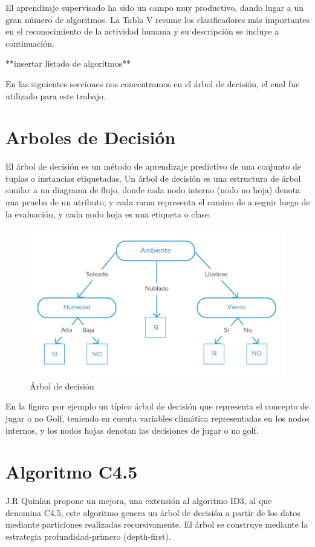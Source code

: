 El aprendizaje supervisado ha sido un campo muy productivo, dando lugar a un gran número de algoritmos. La Tabla V resume los clasificadores más importantes en el reconocimiento de la actividad humana y su descripción se incluye a continuación.

**insertar listado de algoritmos**

En las siguientes secciones nos concentramos en el árbol de decisión, el cual fue utilizado para este trabajo.

\section{Arboles de Decisión}
El árbol de decisión es un método de aprendizaje predictivo de una conjunto de tuplas o instancias etiquetadas. Un árbol de decisión es una estructura de árbol similar a un diagrama de flujo, donde cada nodo interno (nodo no hoja) denota una prueba de un atributo, y cada rama representa el camino de a seguir luego de la evaluación, y cada nodo hoja es una etiqueta o clase.

\begin{figure}[!htbp]
	\centering
	\includegraphics[width=0.7\linewidth]{capitulo-3/graphics/ad_2}
	\caption[Árbol de decisión]{Árbol de decisión}
	\label{fig:arbolEjemplo}
\end{figure}

En la figura por ejemplo un típico árbol de decisión que representa el concepto de jugar o no Golf, teniendo en cuenta variables climática representadas en los nodos internos, y los nodos hojas denotan las decisiones de jugar o no golf. 

\section{Algoritmo C4.5}
J.R Quinlan propone un mejora, una extensión al algoritmo ID3, al que denomina C4.5, este algoritmo genera un árbol de decisión a partir de los datos mediante particiones realizadas recursivamente. El árbol se construye mediante la estrategia profundidad-primero (depth-first).

